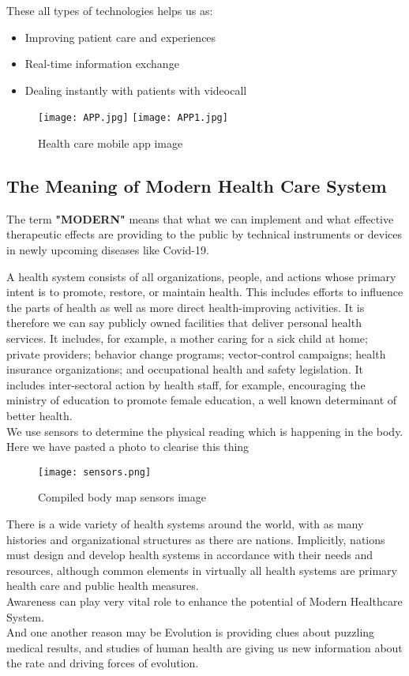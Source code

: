 \documentclass[12pts]{article}
\begin{document}
These all types of technologies helps us as:
\begin{itemize}
\item Improving patient care and experiences
\item Real-time information exchange
\item Dealing instantly with patients with videocall  
\end{itemize}

\begin{figure}[h]
\centering
\texttt{[image: APP.jpg]}
\texttt{[image: APP1.jpg]}
\caption{Health care mobile app image}
\end{figure}

\subsection*{The Meaning of Modern Health Care System}
The term \textbf{"MODERN"} means that what we can implement and what effective therapeutic effects are providing to the public by technical instruments or devices in newly upcoming diseases like Covid-19.

A health system consists of all organizations, people, and actions whose primary intent is to promote, restore, or maintain health. This includes efforts to influence the parts of health as well as more direct health-improving activities.
It is therefore we can say publicly owned facilities that deliver personal health services. It includes, for example, a mother caring for a sick child at home; private providers; behavior change programs; vector-control campaigns; health insurance organizations; and occupational health and safety legislation. It includes inter-sectoral action by health staff, for example, encouraging the ministry of education to promote female education, a well known determinant of better health.\\
We use sensors to determine the physical reading which is happening in the body. Here we have pasted a photo to clearise this thing

\begin{figure}[h]
\centering
\texttt{[image: sensors.png]}
\caption{Compiled body map sensors image}
\end{figure}

There is a wide variety of health systems around the world, with as many histories and organizational structures as there are nations. Implicitly, nations must design and develop health systems in accordance with their needs and resources, although common elements in virtually all health systems are primary health care and public health measures.\\
Awareness can play very vital role to enhance the potential of Modern Healthcare System.\\
And one another reason may be Evolution is providing clues about puzzling medical results, and studies of human health are giving us new information about the rate and driving forces of evolution.
\end{document}
